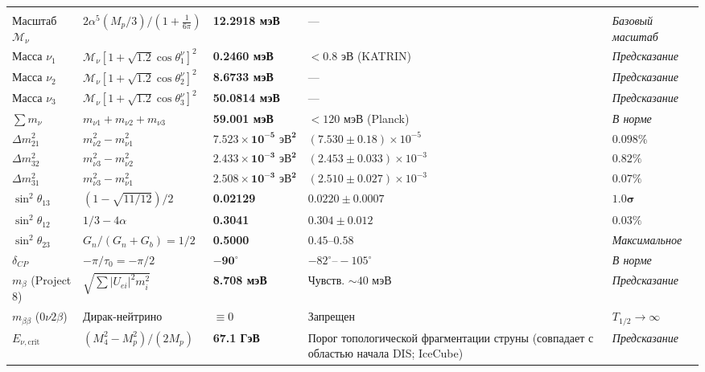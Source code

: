 \documentclass[11pt,a4paper]{article}
\theoremstyle{definition}
\theoremstyle{remark}
\begin{document}
\begin{xltabular}{\textwidth}{>{\raggedright\arraybackslash}p{3.2cm} X >{\centering\arraybackslash}p{2.7cm} >{\centering\arraybackslash}p{3.0cm} >{\raggedleft\arraybackslash}p{2.1cm}}
 \\
Масштаб $\mathcal{M}_\nu$ & $2\alpha^5 (M_p/3) / (1 + \frac{1}{6\pi})$ & \textbf{12.2918 мэВ} & --- & \textit{Базовый масштаб} \\
Масса $\nu_1$ & $\mathcal{M}_\nu [1 + \sqrt{1.2}\cos\theta_1^\nu]^2$ & \textbf{0.2460 мэВ} & $< 0.8$ эВ (KATRIN) & \textit{Предсказание} \\
Масса $\nu_2$ & $\mathcal{M}_\nu [1 + \sqrt{1.2}\cos\theta_2^\nu]^2$ & \textbf{8.6733 мэВ} & --- & \textit{Предсказание} \\
Масса $\nu_3$ & $\mathcal{M}_\nu [1 + \sqrt{1.2}\cos\theta_3^\nu]^2$ & \textbf{50.0814 мэВ} & --- & \textit{Предсказание} \\
$\sum m_\nu$ & $m_{\nu 1} + m_{\nu 2} + m_{\nu 3}$ & \textbf{59.001 мэВ} & $< 120$ мэВ (Planck) & \textit{В норме} \\
$\Delta m_{21}^2$ & $m_{\nu 2}^2 - m_{\nu 1}^2$ & $\mathbf{7.523 \times 10^{-5} \text{ эВ}^2}$ & $(7.530 \pm 0.18) \times 10^{-5}$ & $\mathbf{0.098\%}$ \\
$\Delta m_{32}^2$ & $m_{\nu 3}^2 - m_{\nu 2}^2$ & $\mathbf{2.433 \times 10^{-3} \text{ эВ}^2}$ & $(2.453 \pm 0.033) \times 10^{-3}$ & $\mathbf{0.82\%}$ \\
$\Delta m_{31}^2$ & $m_{\nu 3}^2 - m_{\nu 1}^2$ & $\mathbf{2.508 \times 10^{-3} \text{ эВ}^2}$ & $(2.510 \pm 0.027) \times 10^{-3}$ & $\mathbf{0.07\%}$ \\
$\sin^2\theta_{13}$ & $(1 - \sqrt{11/12})/2$ & \textbf{0.02129} & $0.0220 \pm 0.0007$ & $\mathbf{1.0\sigma}$ \\
$\sin^2\theta_{12}$ & $1/3 - 4\alpha$ & \textbf{0.3041} & $0.304 \pm 0.012$ & $\mathbf{0.03\%}$ \\
$\sin^2\theta_{23}$ & $G_n / (G_n + G_b) = 1/2$ & \textbf{0.5000} & $0.45 \text{--} 0.58$ & \textit{Максимальное} \\
$\delta_{CP}$ & $-\pi/\tau_0 = -\pi/2$ & $\mathbf{-90^\circ}$ & $-82^\circ \text{--} -105^\circ$ & \textit{В норме} \\
$m_\beta$ (Project 8) & $\sqrt{\sum |U_{ei}|^2 m_i^2}$ & \textbf{8.708 мэВ} & Чувств. $\sim 40$ мэВ & \textit{Предсказание} \\
$m_{\beta\beta}$ ($0\nu 2\beta$) & Дирак-нейтрино & \textbf{$\equiv 0$} & Запрещен & $T_{1/2} \to \infty$ \\
$E_{\nu, \text{crit}}$ & $(M_4^2 - M_p^2)/(2M_p)$ & \textbf{67.1 ГэВ} & Порог топологической фрагментации струны (совпадает с областью начала DIS; IceCube) & \textit{Предсказание} \\
\midrule


\end{xltabular}
\end{document}
